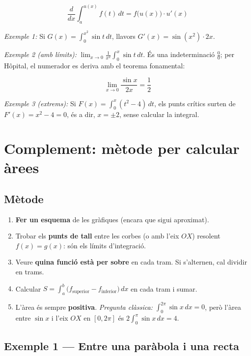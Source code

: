 \begin{equation*}
\frac{d}{dx}\int_a^{u(x)} f(t)\,dt=f\bigl(u(x)\bigr)\cdot u'(x)
\end{equation*}

\emph{Exemple 1:} Si $G(x)=\displaystyle\int_0^{x^2}\sin t\,dt$, llavors $G'(x)=\sin(x^2)\cdot 2x$.

\emph{Exemple 2 (amb límits):} $\displaystyle\lim_{x\to0}\frac{1}{x^2}\int_0^x\sin t\,dt$. És una indeterminació $\frac00$; per Hôpital, el numerador es deriva amb el teorema fonamental:

\begin{equation*}
\lim_{x\to0}\frac{\sin x}{2x}=\frac12
\end{equation*}

\emph{Exemple 3 (extrems):} Si $F(x)=\displaystyle\int_0^x (t^2-4)\,dt$, els punts crítics surten de $F'(x)=x^2-4=0$, és a dir, $x=\pm2$, sense calcular la integral.

\section{Complement: mètode per calcular àrees}

\subsection{Mètode}

\begin{enumerate}
\item \textbf{Fer un esquema} de les gràfiques (encara que sigui aproximat).
\item Trobar els \textbf{punts de tall} entre les corbes (o amb l'eix $OX$) resolent $f(x)=g(x)$: són els límits d'integració.
\item Veure \textbf{quina funció està per sobre} en cada tram. Si s'alternen, cal dividir en trams.
\item Calcular $\displaystyle S=\int_a^b\bigl(f_{\text{superior}}-f_{\text{inferior}}\bigr)\,dx$ en cada tram i sumar.
\item L'àrea és sempre \textbf{positiva}. \emph{Pregunta clàssica:} $\displaystyle\int_0^{2\pi}\sin x\,dx=0$, però l'àrea entre $\sin x$ i l'eix $OX$ en $[0,2\pi]$ és $2\displaystyle\int_0^{\pi}\sin x\,dx=4$.
\end{enumerate}

\subsection{Exemple 1 --- Entre una paràbola i una recta}

